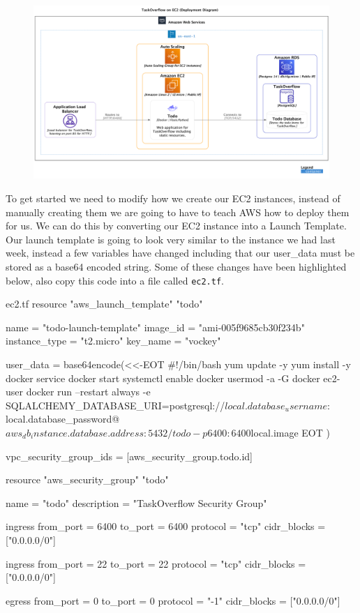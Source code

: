 \documentclass{csse4400}
\begin{document}
\begin{figure}[H]
  \includegraphics[width=\textwidth]{diagrams/ec2deployment}
\end{figure}

To get started we need to modify how we create our EC2 instances, instead of manually creating them we are going to have to teach AWS how to deploy them for us. We can do this by converting our EC2 instance into a Launch Template. Our launch template is going to look very similar to the instance we had last week, instead a few variables have changed including that our user\_data must be stored as a base64 encoded string. Some of these changes have been highlighted below, also copy this code into a file called \texttt{ec2.tf}.


\begin{code}[language=terraform,numbers=none]{ec2.tf}
resource "aws_launch_template" "todo" {
  name = "todo-launch-template"
  image_id = "ami-005f9685cb30f234b"
  instance_type = "t2.micro"
  key_name = "vockey"

  user_data = base64encode(<<-EOT
    #!/bin/bash
    yum update -y
    yum install -y docker
    service docker start
    systemctl enable docker
    usermod -a -G docker ec2-user 
    docker run --restart always -e SQLALCHEMY_DATABASE_URI=postgresql://${local.database_username}:${local.database_password}@${aws_db_instance.database.address}:5432/todo -p 6400:6400 ${local.image}
EOT
  )

  vpc_security_group_ids = [aws_security_group.todo.id]
}


resource "aws_security_group" "todo" {
  name = "todo"
  description = "TaskOverflow Security Group"

  ingress {
    from_port = 6400
    to_port = 6400
    protocol = "tcp"
    cidr_blocks = ["0.0.0.0/0"]
  }

  ingress {
    from_port = 22
    to_port = 22
    protocol = "tcp"
    cidr_blocks = ["0.0.0.0/0"]
  }

  egress {
    from_port = 0
    to_port = 0
    protocol = "-1"
    cidr_blocks = ["0.0.0.0/0"]
  }
}
\end{code}
\end{document}
